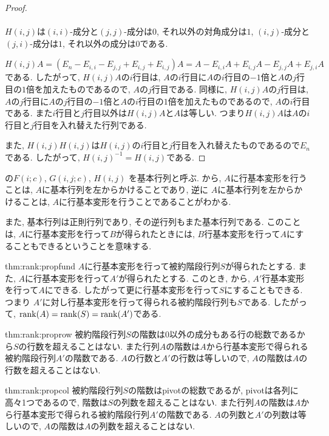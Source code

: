 \begin{proof}
  \paragraph{}
  $H(i,j)$は$(i,i)$-成分と$(j,j)$-成分は$0$, それ以外の対角成分は$1$,
  $(i,j)$-成分と$(j,i)$-成分は$1$, それ以外の成分は$0$である.

  $H(i,j)A=(E_n-E_{i,i}-E_{j,j}+E_{i,j}+E_{i,j})A=A-E_{i,i}A+E_{i,j}A-E_{j,j}A+E_{j,i}A$
  である.
  したがって,
  $H(i,j)A$の$i$行目は,
  $A$の$i$行目に$A$の$i$行目の$-1$倍と$A$の$j$行目の$1$倍を加えたものであるので,
  $A$の$j$行目である.
  同様に, $H(i,j)A$の$j$行目は,
  $A$の$j$行目に$A$の$j$行目の$-1$倍と$A$の$i$行目の$1$倍を加えたものであるので,
  $A$の$i$行目である.
  また$i$行目と$j$行目以外は$H(i,j)A$と$A$は等しい.
  つまり$H(i,j)A$は$A$の$i$行目と$j$行目を入れ替えた行列である.
  
  また, $H(i,j)H(i,j)$は$H(i,j)$の$i$行目と$j$行目を入れ替えたものであるので$E_n$である.
  したがって, $H(i,j)^{-1}=H(i,j)$である.
\end{proof}

\begin{remark}
  \label{lem:fund:is:invertible}
  の$F(i;c)$, $G(i,j;c)$, $H(i,j)$
  を基本行列と呼ぶ.
  から,
  $A$に行基本変形を行うことは,
  $A$に基本行列を左からかけることであり,
  逆に
  $A$に基本行列を左からかけることは,
  $A$に行基本変形を行うことであることがわかる.

  また, 基本行列は正則行列であり, その逆行列もまた基本行列である.
  このことは, $A$に行基本変形を行って$B$が得られたときには,
  $B$行基本変形を行って$A$にすることもできるということを意味する.
\end{remark}

\begin{proofof*}{thm:rank:prop}{fund}
  $A$に行基本変形を行って被約階段行列$S$が得られたとする.
  また, $A$に行基本変形を行って$A'$が得られたとする.
  このとき,
  から, 
  $A'$行基本変形を行って$A$にできる.
  したがって更に行基本変形を行って$S$にすることもできる.
  つまり
  $A'$に対し行基本変形を行って得られる被約階段行列も$S$である.
  したがって, $\operatorname{rank}(A)=\operatorname{rank}(S)=\operatorname{rank}(A')$である.
\end{proofof*}

\begin{proofof*}{thm:rank:prop}{row}
  被約階段行列$S$の階数は$0$以外の成分もある行の総数であるから$S$の行数を超えることはない.
  また行列$A$の階数は$A$から行基本変形で得られる被約階段行列$A'$の階数である.
  $A$の行数と$A'$の行数は等しいので, $A$の階数は$A$の行数を超えることはない.
\end{proofof*}
\begin{proofof*}{thm:rank:prop}{col}
  被約階段行列$S$の階数はpivotの総数であるが,
  pivotは各列に高々1つであるので, 階数は$S$の列数を超えることはない.
  また行列$A$の階数は$A$から行基本変形で得られる被約階段行列$A'$の階数である.
  $A$の列数と$A'$の列数は等しいので, $A$の階数は$A$の列数を超えることはない.
\end{proofof*}

